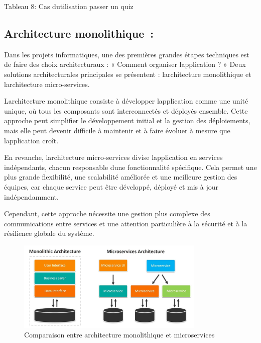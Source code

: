 \documentclass[12pt,a4paper,twoside,openright]{report}
\begin{document}
\protect\hypertarget{_Toc203823482}{}{}Tableau 8: Cas
d\textquotesingle utilisation passer un quiz

\hypertarget{architecture-monolithique}{%
\subsection{Architecture
monolithique~:}\label{architecture-monolithique}}

Dans les projets informatiques, une des premières grandes étapes
techniques est de faire des choix architecturaux : « Comment organiser
l\textquotesingle application ? » Deux solutions architecturales
principales se présentent : l\textquotesingle architecture monolithique
et l\textquotesingle architecture micro-services.

L\textquotesingle architecture monolithique consiste à développer
l\textquotesingle application comme une unité unique, où tous les
composants sont interconnectés et déployés ensemble. Cette approche peut
simplifier le développement initial et la gestion des déploiements, mais
elle peut devenir difficile à maintenir et à faire évoluer à mesure que
l\textquotesingle application croît.

En revanche, l\textquotesingle architecture micro-services divise
l\textquotesingle application en services indépendants, chacun
responsable d\textquotesingle une fonctionnalité spécifique. Cela permet
une plus grande flexibilité, une scalabilité améliorée et une meilleure
gestion des équipes, car chaque service peut être développé, déployé et
mis à jour indépendamment.

Cependant, cette approche nécessite une gestion plus complexe des
communications entre services et une attention particulière à la
sécurité et à la résilience globale du système.

\begin{figure}[H]
\centering
\includegraphics[width=0.8\textwidth]{latex_media/media/image15.jpeg}
\caption{Comparaison entre architecture monolithique et microservices}
\label{fig:comparaison-architectures}
\end{figure}
\end{document}

